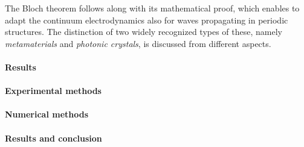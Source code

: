 The Bloch theorem follows along with its mathematical proof, which enables to adapt the continuum electrodynamics also for waves propagating in periodic structures. 
The distinction of two widely recognized types of these, namely \textit{metamaterials} and \textit{photonic crystals}, is discussed from different aspects. 

\paragraph{Results} %

\paragraph{Experimental methods} %

\paragraph{Numerical methods} %

\paragraph{Results and conclusion} %




